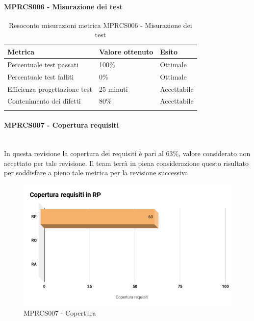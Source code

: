 \paragraph{MPRCS006 - Misurazione dei test}
\begin{center}
	\centering
	\renewcommand{\arraystretch}{1.5}
	\begin{longtable}{  p{5cm}  p{5cm} p{3cm}  }
		\rowcolor{tableHeadYellow}
		\textbf{Metrica}   & \textbf{Valore ottenuto} & \textbf{Esito} \\ 
		\endhead
		Percentuale test passati     & 100\%  & Ottimale \\
		Percentuale test falliti     & 0\% & Ottimale \\
		Efficienza progettazione test    & 25 minuti & Accettabile \\
		Contenimento dei difetti    & 80\% & Accettabile \\
		\rowcolor{white}
		\caption{Resoconto misurazioni metrica MPRCS006 - Misurazione dei test}
	\end{longtable}
\end{center}
\paragraph{MPRCS007 - Copertura requisiti}\mbox{}\\[0.4cm]
In questa revisione la copertura dei requisiti è pari al 63\%, valore considerato non accettato per tale revisione.
Il team terrà in piena considerazione questo risultato per soddisfare a pieno tale metrica per la revisione successiva
\begin{figure}[H]
	\centering
	\includegraphics[width=13cm,keepaspectratio]{../includes/pics/CoperturaRP.png}
	\caption{\label{fig:mission}MPRCS007 - Copertura}
\end{figure}

